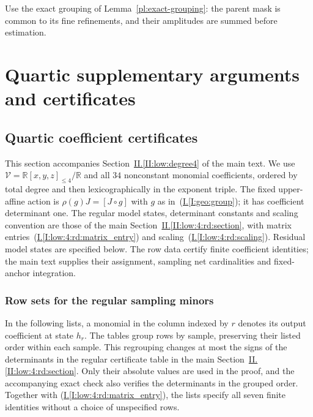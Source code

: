 \documentclass[11pt]{amsart}
\theoremstyle{definition}
\theoremstyle{remark}
\numberwithin{equation}{section}
\newcommand{\partIref}[1]{\hyperref[I:#1]{I.\ref*{I:#1}}}
\newcommand{\partIeqref}[1]{\textup{(\partIref{#1})}}
\newcommand{\partIIref}[1]{\hyperref[II:#1]{II.\ref*{II:#1}}}
\begin{document}
Use the exact grouping of Lemma~\ref{pl:exact-grouping}: the parent mask is common to its fine refinements, and their amplitudes are summed before estimation.

\section{Quartic supplementary arguments and certificates}

\subsection{Quartic coefficient certificates}\label{sup:quartic}

This section accompanies Section~\partIIref{low:degree4} of the main text. We use $\mathcal V=\mathbb R[x,y,z]_{\le4}/\mathbb R$ and all $34$ nonconstant monomial coefficients, ordered by total degree and then lexicographically in the exponent triple. The fixed upper-affine action is $\rho(g)J=[J\circ g]$ with $g$ as in~\partIeqref{geo:group}; it has coefficient determinant one. The regular model states, determinant constants and scaling convention are those of the main Section~\partIIref{low:4:rd:section}, with matrix entries~\partIeqref{low:4:rd:matrix_entry} and scaling~\partIeqref{low:4:rd:scaling}. Residual model states are specified below. The row data certify finite coefficient identities; the main text supplies their assignment, sampling net cardinalities and fixed-anchor integration.

\subsubsection{Row sets for the regular sampling minors}\label{low:4:rd:rows}

In the following lists, a monomial in the column indexed by $r$ denotes its output coefficient at state $h_r$. The tables group rows by sample, preserving their listed order within each sample. This regrouping changes at most the signs of the determinants in the regular certificate table in the main Section~\partIIref{low:4:rd:section}. Only their absolute values are used in the proof, and the accompanying exact check also verifies the determinants in the grouped order. Together with \partIeqref{low:4:rd:matrix_entry}, the lists specify all seven finite identities without a choice of unspecified rows.
\end{document}
